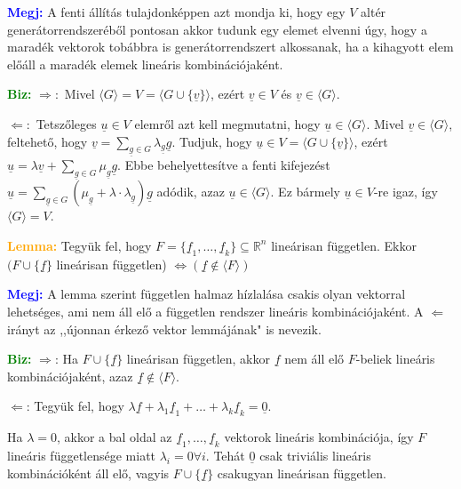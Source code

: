 \documentclass[../szamtud.tex]{subfiles}
\begin{document}
        \textcolor{blue}{\textbf{Megj:}} A fenti állítás tulajdonképpen azt mondja ki, hogy egy $V$ altér generátorrendszeréből pontosan akkor tudunk egy elemet elvenni úgy, hogy a maradék vektorok tobábbra is generátorrendszert alkossanak, ha a kihagyott elem előáll a maradék elemek lineáris kombinációjaként.

        \textcolor{green}{\textbf{Biz:}} $\Rightarrow:$ Mivel $\langle G \rangle = V = \langle G \cup \{\underline{v}\} \rangle$, ezért $\underline{v} \in V$ és $\underline{v} \in \langle G \rangle$.

        $\Leftarrow:$ Tetszőleges $\underline{u} \in V$ elemről azt kell megmutatni, hogy $\underline{u} \in \langle G \rangle$. Mivel $\underline{v} \in \langle G \rangle$, feltehető, hogy $\underline{v} = \sum_{\underline{g}\in G}\lambda_{\underline{g}}\underline{g}$. Tudjuk, hogy $\underline{u} \in V = \langle G \cup \{\underline{v}\} \rangle$, ezért $\underline{u} = \lambda\underline{v} + \sum_{\underline{g}\in G}\mu_{\underline{g}}\underline{g}$. Ebbe behelyettesítve a fenti kifejezést $\underline{u} = \sum_{\underline{g}\in G} (\mu_{\underline{g}} + \lambda \cdot \lambda_{\underline{g}}) \underline{g}$ adódik, azaz $\underline{u} \in \langle G \rangle$. Ez bármely $\underline{u} \in V$-re igaz, így $\langle G \rangle = V$.

        \textcolor{orange}{\textbf{Lemma:}} Tegyük fel, hogy $F = \{\underline{f}_1, \dots, \underline{f}_k\} \subseteq \mathbb{R}^n$ lineárisan független. Ekkor $(F \cup \{\underline{f}\}$ lineárisan független) $\Longleftrightarrow (\underline{f} \notin \langle F \rangle)$

        \textcolor{blue}{\textbf{Megj:}} A lemma szerint független halmaz hízlalása csakis olyan vektorral lehetséges, ami nem áll elő a független rendszer lineáris kombinációjaként. A $\Leftarrow$ irányt az ,,újonnan érkező vektor lemmájának" is nevezik.

        \textcolor{green}{\textbf{Biz:}} $\Rightarrow$: Ha $F \cup \{\underline{f}\}$ lineárisan független, akkor $\underline{f}$ nem áll elő $F$-beliek lineáris kombinációjaként, azaz $\underline{f} \notin \langle F \rangle$.

        $\Leftarrow$: Tegyük fel, hogy $\lambda \underline{f} + \lambda_1 \underline{f}_1 + \dots + \lambda_k \underline{f}_k = \underline{0}$.

        Ha $\lambda = 0$, akkor a bal oldal az $\underline{f}_1, \dots, \underline{f}_k$ vektorok lineáris kombinációja, így $F$ lineáris függetlensége miatt $\lambda_i = 0 \forall i$. Tehát $\underline{0}$ csak triviális lineáris kombinációként áll elő, vagyis $F \cup \{\underline{f}\}$ csakugyan lineárisan független.
\end{document}

